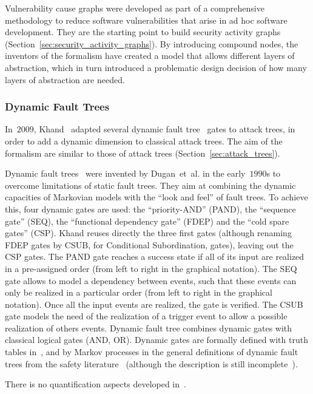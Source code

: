\documentclass[a4paper]{article}
\begin{document}
Vulnerability cause graphs were developed as part of a comprehensive
methodology to reduce software vulnerabilities that arise in ad hoc software
development. They are the starting point to build security activity graphs
(Section~\ref{sec:security_activity_graphs}). By introducing compound nodes,
the inventors of the formalism have created a model that allows different 
layers of abstraction, which in turn introduced a problematic design
decision of how many layers of abstraction are needed.

\subsubsection{Dynamic Fault Trees} 
\label{sec:dynamic_fault_trees}

In~$2009$, Khand~\cite{Khan} adapted several dynamic fault 
tree~\cite{Dugan1990,DuBaBo} gates to attack trees, in order to add a dynamic
dimension to classical attack trees. The aim of the formalism are similar
to those of attack trees (Section~\ref{sec:attack_trees}).

Dynamic fault trees~\cite{Dugan1990,DuBaBo} were invented by Dugan~et~al. in
the early~$1990$s to overcome limitations of static fault trees. They aim at
combining the dynamic capacities of Markovian models with the ``look and feel''
of fault trees. To achieve this, four dynamic gates are used: the
``priority-AND'' (PAND), the ``sequence gate'' (SEQ), the ``functional 
dependency gate'' (FDEP) and the ``cold spare gates'' (CSP). Khand reuses 
directly the three first gates (although renaming FDEP gates by CSUB, for 
Conditional Subordination, gates), leaving out the CSP gates. The PAND gate 
reaches a success state if all of its input are realized in a pre-assigned 
order (from left to right in the graphical notation). The SEQ gate allows to 
model a dependency between events, such that these events can only be realized 
in a particular order (from left to right in the graphical notation). Once all 
the input events are realized, the gate is verified. The CSUB gate models the 
need of the realization of a trigger event to allow a possible realization of 
others events. Dynamic fault tree combines dynamic gates with classical logical 
gates (AND, OR). Dynamic gates are formally defined with truth tables 
in~\cite{Khan}, and by Markov processes in the general definitions of dynamic 
fault trees from the safety literature~\cite{Dugan1990,DuBaBo} (although the 
description is still incomplete~\cite{Boui}).

There is no quantification aspects developed in~\cite{Khan}.
\end{document}
